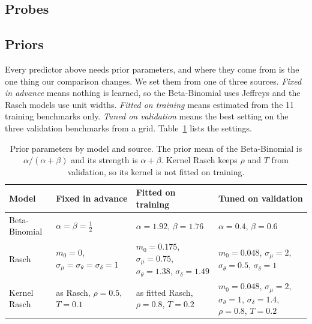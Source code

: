 \documentclass{article}
\begin{document}
\subsection{Probes}\label{sec:probes}


\subsection{Priors}
Every predictor above needs prior parameters, and where they come from is the one thing our comparison changes. We set them from one of three sources. \emph{Fixed in advance} means nothing is learned, so the Beta-Binomial uses Jeffreys and the Rasch models use unit widths. \emph{Fitted on training} means estimated from the 11 training benchmarks only. \emph{Tuned on validation} means the best setting on the three validation benchmarks from a grid. Table~\ref{tab:settings} lists the settings.

\begin{table}[!t]
\centering
\caption{Prior parameters by model and source. The prior mean of the Beta-Binomial is $\alpha/(\alpha+\beta)$ and its strength is $\alpha+\beta$. Kernel Rasch keeps $\rho$ and $T$ from validation, so its kernel is not fitted on training.}
\label{tab:settings}
\footnotesize\setlength{\tabcolsep}{4pt}\renewcommand{\arraystretch}{1.15}
\begin{tabular}{@{}l>{\raggedright\arraybackslash}p{3.0cm}>{\raggedright\arraybackslash}p{4.1cm}>{\raggedright\arraybackslash}p{4.1cm}@{}}
\toprule
Model & Fixed in advance & Fitted on training & Tuned on validation\\
\midrule
Beta-Binomial & $\alpha=\beta=\tfrac12$ & $\alpha=1.92$, $\beta=1.76$ & $\alpha=0.4$, $\beta=0.6$\\
Rasch & $m_0=0$, $\sigma_\mu=\sigma_\theta=\sigma_\delta=1$ & $m_0=0.175$, $\sigma_\mu=0.75$, $\sigma_\theta=1.38$, $\sigma_\delta=1.49$ & $m_0=0.048$, $\sigma_\mu=2$, $\sigma_\theta=0.5$, $\sigma_\delta=1$\\
Kernel Rasch & as Rasch, $\rho=0.5$, $T=0.1$ & as fitted Rasch, $\rho=0.8$, $T=0.2$ & $m_0=0.048$, $\sigma_\mu=2$, $\sigma_\theta=1$, $\sigma_\delta=1.4$, $\rho=0.8$, $T=0.2$\\
\bottomrule
\end{tabular}
\end{table}
\end{document}
